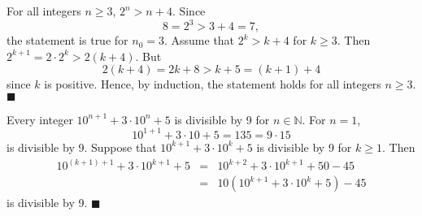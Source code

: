 \medskip
 
For all integers $n \geq 3$, $2^n > n + 4$. Since
$$
8 = 2^3 > 3 + 4 = 7,
$$
the statement is true for $n_0 = 3$.  Assume that $2^k > k + 4$ for $k \geq 3$.  Then $2^{k + 1} = 2 \cdot 2^{k} > 2(k + 4)$.  But 
$$
2(k + 4) = 2k + 8 > k + 5 = (k + 1) + 4
$$
since $k$ is positive.  Hence, by induction, the statement holds for all integers $n \geq 3$. 
\hspace{\fill} $\blacksquare$

\medskip

Every integer $10^{n + 1} + 3 \cdot 10^n + 5$ is divisible by 9 for $n \in {\mathbb N}$.  For $n = 1$, 
$$
10^{1 + 1} + 3 \cdot 10 + 5 = 135 = 9 \cdot 15
$$
is divisible by 9.  Suppose that $10^{k + 1} + 3 \cdot 10^k + 5$ is divisible by 9 for $k \geq 1$.  Then 
\begin{eqnarray*}
10^{(k + 1) + 1} + 3 \cdot 10^{k + 1} + 5
& = &
10^{k + 2} + 3 \cdot 10^{k + 1} + 50 - 45 \\
& = &
10 (10^{k + 1} + 3 \cdot 10^{k} + 5) - 45
\end{eqnarray*}
is divisible by 9.
\hspace{\fill} $\blacksquare$
 
\medskip

